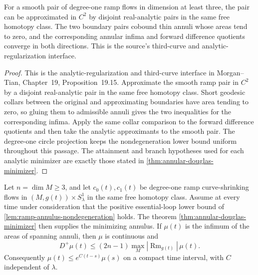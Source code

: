 \begin{lemma}
\label{lem:annular-approximation-comparison}
\notready
For a smooth pair of degree-one ramp flows in dimension at least three, the
pair can be approximated in $C^2$ by disjoint real-analytic pairs in the same
free homotopy class.  The two boundary pairs cobound thin annuli whose areas
tend to zero, and the corresponding annular infima and forward difference
quotients converge in both directions.  This is the source's third-curve and
analytic-regularization interface.
\end{lemma}

\begin{proof}
This is the analytic-regularization and third-curve interface in
Morgan--Tian, Chapter~19, Proposition~19.15.  Approximate the smooth ramp
pair in $C^2$ by a disjoint real-analytic pair in the same free homotopy
class.  Short geodesic collars between the original and approximating
boundaries have area tending to zero, so gluing them to admissible annuli
gives the two inequalities for the corresponding infima.  Apply the same
collar comparison to the forward difference quotients and then take the
analytic approximants to the smooth pair.  The degree-one circle projection
keeps the nondegeneration lower bound uniform throughout this passage.  The
attainment and branch hypotheses used for each analytic minimizer are exactly
those stated in \ref{thm:annular-douglas-minimizer}.
\end{proof}

\begin{lemma}
\label{lem:annular-area-infimum-variation}
\notready
Let $n=\dim M\ge3$, and let $c_0(t),c_1(t)$ be degree-one ramp
curve-shrinking flows in $(M,g(t))\times S^1_\lambda$ in the same free
homotopy class.  Assume at every time under consideration that the positive
essential-loop lower bound of
\ref{lem:ramp-annulus-nondegeneration} holds.  The theorem
\ref{thm:annular-douglas-minimizer} then supplies the minimizing annulus.  If
$\mu(t)$ is the infimum of the areas of spanning annuli,
then $\mu$ is continuous and
\[
 D^+\mu(t)\le(2n-1)\max_M|\operatorname{Rm}_{g(t)}|\,\mu(t).
\]
Consequently $\mu(t)\le e^{C(t-s)}\mu(s)$ on a compact time interval, with
$C$ independent of $\lambda$.
\end{lemma}

